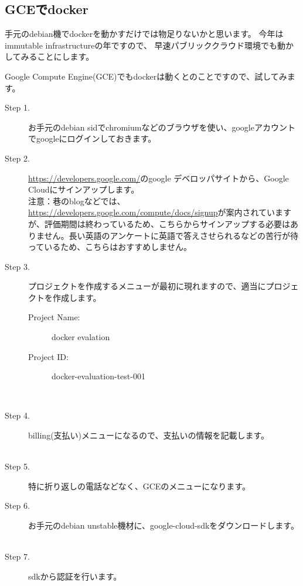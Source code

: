 \documentclass[mingoth,a4paper]{jsarticle}
\begin{document}
\subsection{GCEでdocker}

 手元のdebian機でdockerを動かすだけでは物足りないかと思います。
今年はimmutable infrastructure\cite{immuta-desc}の年ですので、
早速パブリッククラウド環境でも動かしてみることにします。

 Google Compute Engine(GCE)でもdockerは動くとのことですので、試してみます。

\begin{description}
 \item [Step 1.] お手元のdebian sidでchromiumなどのブラウザを使い、googleアカウントでgoogleにログインしておきます。
 \item [Step 2.] \url{https://developers.google.com/}のgoogle デベロッパサイトから、Google Cloudにサインアップします。\\
注意：巷のblogなどでは、\url{https://developers.google.com/compute/docs/signup}が案内されていますが、評価期間は終わっているため、こちらからサインアップする必要はありません。長い英語のアンケートに英語で答えさせられるなどの苦行が待っているため、こちらはおすすめしません。
 \item [Step 3.] プロジェクトを作成するメニューが最初に現れますので、適当にプロジェクトを作成します。
　　\begin{description} 
     \item [Project Name:] docker evalation
     \item [Project ID:] docker-evaluation-test-001
   \end{description}
　　　\item [Step 4.] billing(支払い)メニューになるので、支払いの情報を記載します。
　　　　\item [Step 5.] 特に折り返しの電話などなく、GCEのメニューになります。
　　　\item [Step 6.] お手元のdebian unstable機材に、google-cloud-sdkをダウンロードします。
    \item [Step 7.] sdkから認証を行います。

\end{description}
\end{document}
